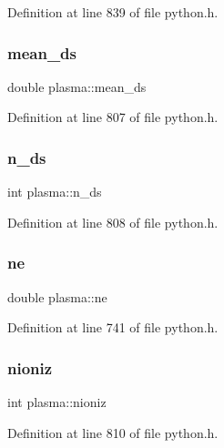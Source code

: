 Definition at line 839 of file python.\+h.

\mbox{\label{structplasma_a50251baa932d22c94584c04ce0398a36}} 
\subsubsection{\texorpdfstring{mean\+\_\+ds}{mean\_ds}}
{\footnotesize\ttfamily double plasma\+::mean\+\_\+ds}



Definition at line 807 of file python.\+h.

\mbox{\label{structplasma_a579b07a98a0b0692e5e6e2465c2ab425}} 
\subsubsection{\texorpdfstring{n\+\_\+ds}{n\_ds}}
{\footnotesize\ttfamily int plasma\+::n\+\_\+ds}



Definition at line 808 of file python.\+h.

\mbox{\label{structplasma_ac1d38c3e4cc4ef2a1e4d83d7f8b71d22}} 
\subsubsection{\texorpdfstring{ne}{ne}}
{\footnotesize\ttfamily double plasma\+::ne}



Definition at line 741 of file python.\+h.

\mbox{\label{structplasma_ada72c65c218f315e543710ce8808e225}} 
\subsubsection{\texorpdfstring{nioniz}{nioniz}}
{\footnotesize\ttfamily int plasma\+::nioniz}



Definition at line 810 of file python.\+h.

